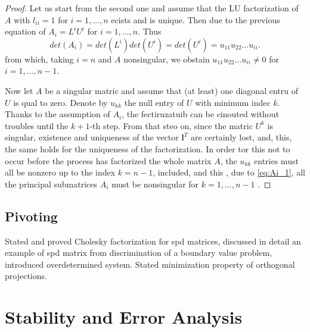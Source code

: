 \documentclass{article}
\theoremstyle{remark}
\begin{document}
\begin{proof}
    \par
    Let us start from the second one and assume that the LU factorization of $A$ with $l_{ii} = 1$ for $i  =  1, \ldots, n$ ecists and is unique.  Then due to the previous equation of $A_{i} = L^{i} U ^{i}$ for $i = 1, \ldots, n$. Thus
    \begin{equation}
    \label{eq:Ai_1}
    det\left( A_{i} \right) = det\left( L^{i} \right) det\left( U^{i} \right) =  det\left( U^{i} \right) =  u_{11} u_{22} \ldots u_{ii}
    .\end{equation}
    from which, taking $i = n$ and $A$ nonsingular, we obstain $u_{11} u_{22} \ldots u_{ii} \neq 0$ for $i =  1, \ldots, n-1$. 
    \par
    Now let $A$ be a singular matric and assume that (at least) one diagonal entru of $U$ is qual to zero.  Denote by $u_{kk}$ the null entry of $U$ with minimum indec $k$. Thanks to the assumption of $A_{i}$, the fectiruzatuib can be cinouted without troubles until the $k+1$-th step. From that steo on, since the matric $U^{k}$ is singular, existence and uniqueness of the vector $\mathbf{l}^{T} $ are certainly lost, and, this, the same holds for the uniqueness of the factorization. In order tor
    this not to occur before the process has factorized the whole matrix $A$, the $u_{kk}$ entries must all be nonzero up to the index $k = n-1$, included, and this , due to \eqref{eq:Ai_1}, all the principal submatrices $A_{i}$ must be nonsingular for $k = 1, \ldots, n-1$ .

  \end{proof}



\subsection{Pivoting}%
\label{sub:pivoting}
\begin{tcolorbox}
  Stated and proved Cholesky factorization for spd matrices, discussed in detail an example of spd matrix from discrimination of a boundary value problem, introduced overdetermined system. Stated minimization property of orthogonal projections.
\end{tcolorbox}

\newpage
\section{Stability and Error Analysis}%
\label{sec:stability_and_error_analysis}

 
\end{document}
